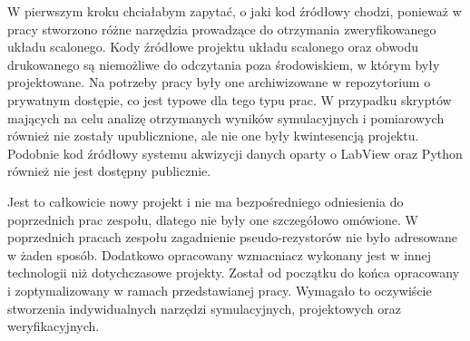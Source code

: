 \begin{frame}[t]
    \begin{block}{\tb}
    \end{block}
    W pierwszym kroku chciałabym zapytać, o jaki kod źródłowy chodzi, ponieważ w pracy stworzono różne narzędzia prowadzące do otrzymania zweryfikowanego układu scalonego. 
    Kody źródłowe projektu układu scalonego oraz obwodu drukowanego są niemożliwe do odczytania poza środowiskiem, w którym były projektowane.
    Na potrzeby pracy były one archiwizowane w repozytorium o prywatnym dostępie, co jest typowe dla tego typu prac.
    W przypadku skryptów mających na celu analizę otrzymanych wyników symulacyjnych i pomiarowych również nie zostały upublicznione, ale nie one były kwintesencją projektu.
    Podobnie kod źródłowy systemu akwizycji danych oparty o LabView oraz Python również nie jest dostępny publicznie.%
    
\end{frame}
\begin{frame}[t]
    \begin{block}{\tb}
    \end{block}

    Jest to całkowicie nowy projekt i nie ma bezpośredniego odniesienia do poprzednich prac zespołu, dlatego nie były one szczegółowo omówione.
    W poprzednich pracach zespołu zagadnienie pseudo-rezystorów nie było adresowane w żaden sposób.
    Dodatkowo opracowany wzmacniacz wykonany jest w innej technologii niż dotychczasowe projekty.
    Został od początku do końca opracowany i zoptymalizowany w ramach przedstawianej pracy.
    Wymagało to oczywiście stworzenia indywidualnych narzędzi symulacyjnych, projektowych oraz weryfikacyjnych. 
\end{frame}

